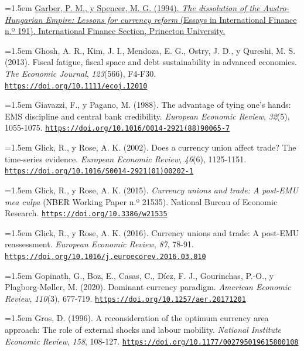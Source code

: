 \documentclass[10pt,a4paper]{article}
\begin{document}
\noindent\hangindent=1.5em \href{https://ies.princeton.edu/pdf/E191.pdf}{Garber, P. M., y Spencer, M. G. (1994). \textit{The dissolution of the Austro-Hungarian Empire: Lessons for currency reform} (Essays in International Finance n.º 191). International Finance Section, Princeton University.}

\noindent\hangindent=1.5em Ghosh, A. R., Kim, J. I., Mendoza, E. G., Ostry, J. D., y Qureshi, M. S. (2013). Fiscal fatigue, fiscal space and debt sustainability in advanced economies. \textit{The Economic Journal}, \textit{123}(566), F4-F30. \href{https://doi.org/10.1111/ecoj.12010}{\nolinkurl{https://doi.org/10.1111/ecoj.12010}}

\noindent\hangindent=1.5em Giavazzi, F., y Pagano, M. (1988). The advantage of tying one's hands: EMS discipline and central bank credibility. \textit{European Economic Review}, \textit{32}(5), 1055-1075. \href{https://doi.org/10.1016/0014-2921(88)90065-7}{\nolinkurl{https://doi.org/10.1016/0014-2921(88)90065-7}}

\noindent\hangindent=1.5em Glick, R., y Rose, A. K. (2002). Does a currency union affect trade? The time-series evidence. \textit{European Economic Review}, \textit{46}(6), 1125-1151. \href{https://doi.org/10.1016/S0014-2921(01)00202-1}{\nolinkurl{https://doi.org/10.1016/S0014-2921(01)00202-1}}

\noindent\hangindent=1.5em Glick, R., y Rose, A. K. (2015). \textit{Currency unions and trade: A post-EMU mea culpa} (NBER Working Paper n.º 21535). National Bureau of Economic Research. \href{https://doi.org/10.3386/w21535}{\nolinkurl{https://doi.org/10.3386/w21535}}

\noindent\hangindent=1.5em Glick, R., y Rose, A. K. (2016). Currency unions and trade: A post-EMU reassessment. \textit{European Economic Review}, \textit{87}, 78-91. \href{https://doi.org/10.1016/j.euroecorev.2016.03.010}{\nolinkurl{https://doi.org/10.1016/j.euroecorev.2016.03.010}}

\noindent\hangindent=1.5em Gopinath, G., Boz, E., Casas, C., Díez, F. J., Gourinchas, P.-O., y Plagborg-Møller, M. (2020). Dominant currency paradigm. \textit{American Economic Review}, \textit{110}(3), 677-719. \href{https://doi.org/10.1257/aer.20171201}{\nolinkurl{https://doi.org/10.1257/aer.20171201}}

\noindent\hangindent=1.5em Gros, D. (1996). A reconsideration of the optimum currency area approach: The role of external shocks and labour mobility. \textit{National Institute Economic Review}, \textit{158}, 108-127. \href{https://doi.org/10.1177/002795019615800108}{\nolinkurl{https://doi.org/10.1177/002795019615800108}}
\end{document}
